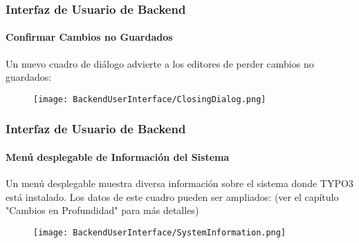 \begin{frame}[fragile]
	\frametitle{Interfaz de Usuario de Backend}
	\framesubtitle{Confirmar Cambios no Guardados}

	Un nuevo cuadro de diálogo advierte a los editores de perder cambios no guardados:

	\begin{figure}
		\texttt{[image: BackendUserInterface/ClosingDialog.png]}
	\end{figure}

\end{frame}

\begin{frame}[fragile]
	\frametitle{Interfaz de Usuario de Backend}
	\framesubtitle{Menú desplegable de Información del Sistema}

	Un menú desplegable muestra diversa información sobre el sistema donde TYPO3
	está instalado. Los datos de este cuadro pueden ser ampliados:\newline
	\small(ver el capítulo "Cambios en Profundidad" para más detalles)\normalsize

	\begin{figure}
		\texttt{[image: BackendUserInterface/SystemInformation.png]}
	\end{figure}

\end{frame}

